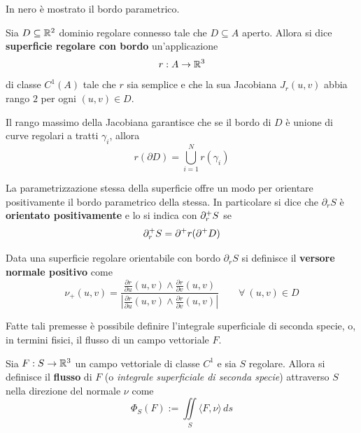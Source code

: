 \begin{example}
\begin{figure}[H]
\begin{minipage}{0.5\textwidth}
     \end{minipage}
     \end{figure}
     In nero è mostrato il bordo parametrico.
 \end{example}
 \begin{definition} \label{Def: Superficie regolare con bordo}
     Sia $D \subseteq \mathbb{R}^2$ dominio regolare connesso tale che $D \subseteq A$ aperto. Allora si dice \textbf{superficie regolare con bordo} un'applicazione
     \begin{equation}
         r: A \to \mathbb{R}^3
     \end{equation}
     di classe $C^1(A)$ tale che $r$ sia semplice e che la sua Jacobiana $J_r(u,v)$ abbia rango $2$ per ogni $(u,v) \in D$.
 \end{definition}
 \begin{oss}
     Il rango massimo della Jacobiana garantisce che se il bordo di $D$ è unione di curve regolari a tratti $\gamma_i$, allora
     \begin{equation}
         r(\partial D)= \bigcup_{i=1}^N r(\gamma_i)
     \end{equation}
 \end{oss}
 \begin{oss}
     La parametrizzazione stessa della superficie offre un modo per orientare positivamente il bordo parametrico della stessa. In particolare si dice che $\partial_r S$ è \textbf{orientato positivamente} e lo si indica con $\partial^+_r S$ se
     \begin{equation}
         \partial^+_r S = \partial^+ r( \partial^+ D)
     \end{equation}
 \end{oss}
 \begin{definition} \label{Def: Versore normale positivo}
     Data una superficie regolare orientabile con bordo $\partial_r S$ si definisce il \textbf{versore normale positivo} come
     \begin{equation}
         \nu_+(u,v) = \frac{\frac{\partial r}{\partial u} (u,v) \wedge \frac{\partial r}{\partial v}(u,v)}{\left|\frac{\partial r}{\partial u}(u,v) \wedge \frac{\partial r}{\partial v}(u,v)\right|} \qquad \forall\ (u,v) \in D
     \end{equation}
 \end{definition}
 Fatte tali premesse è possibile definire l'integrale superficiale di seconda specie, o, in termini fisici, il flusso di un campo vettoriale $F$.
 \begin{definition} \label{Def: Integrale superficiale di seconda specie}
     Sia $F: S \to \mathbb{R}^3$ un campo vettoriale di classe $C^1$ e sia $S$ regolare. Allora si definisce il \textbf{flusso} di $F$ (o \textit{integrale superficiale di seconda specie}) attraverso $S$ nella direzione del normale $\nu$ come
     \begin{equation}
         \Phi_S(F) := \iint\limits_S{\langle F, \nu \rangle}\, ds
     \end{equation}
 \end{definition}
